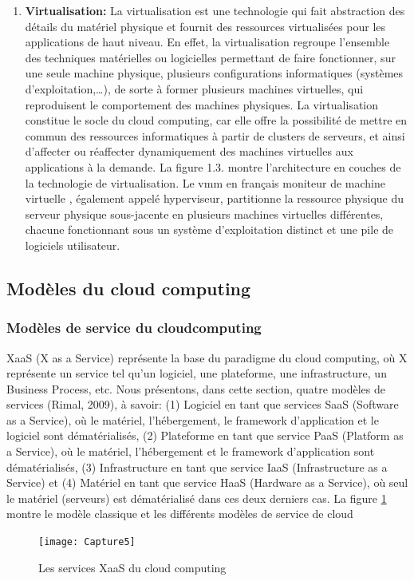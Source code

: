 \begin{enumerate}
\item \textbf{Virtualisation: } La virtualisation est une technologie qui fait abstraction des détails du matériel physique et fournit des ressources virtualisées pour les applications de haut niveau. En effet, la virtualisation regroupe l’ensemble des techniques matérielles ou logicielles permettant de faire fonctionner, sur une seule machine physique, plusieurs configurations informatiques (systèmes d’exploitation,…), de sorte à former plusieurs machines virtuelles, qui reproduisent le comportement des machines physiques. La virtualisation constitue le socle du cloud computing, car elle offre la possibilité de mettre en commun des ressources informatiques à partir de clusters de serveurs, et ainsi d’affecter ou réaffecter dynamiquement des machines virtuelles aux applications à la demande. La figure 1.3. montre l’architecture en couches de la technologie de virtualisation. Le  \ac{vmm} en français moniteur de machine virtuelle  , également appelé hyperviseur, partitionne la ressource physique du serveur physique sous-jacente en plusieurs machines virtuelles  différentes, chacune fonctionnant sous un système d'exploitation distinct et une pile de logiciels utilisateur. 
\end{enumerate}














\subsection{Modèles du cloud computing  }
\subsubsection {Modèles de service du cloudcomputing}  
XaaS (X as a Service) représente la base du paradigme du cloud computing, où X représente un service tel qu’un logiciel, une plateforme, une infrastructure, un Business Process, etc. Nous présentons, dans cette section,  quatre  modèles de services (Rimal, 2009), à savoir: (1) Logiciel en tant que services SaaS (Software as a Service), où le matériel, l’hébergement, le framework d’application et le logiciel sont dématérialisés, (2) Plateforme en tant que service PaaS (Platform as a Service), où le matériel, l’hébergement et le framework d’application sont dématérialisés, (3) Infrastructure en tant que service IaaS (Infrastructure as a Service) et (4) Matériel en tant que service HaaS (Hardware as a Service), où seul le matériel (serveurs) est dématérialisé dans ces deux derniers cas. La figure \ref{fig:capture5} montre le modèle classique et les différents modèles de service de cloud
\begin{figure}[h]
	\centering
	\texttt{[image: Capture5]}
	\caption{Les services XaaS du cloud computing}
	\label{fig:capture5}
\end{figure}


